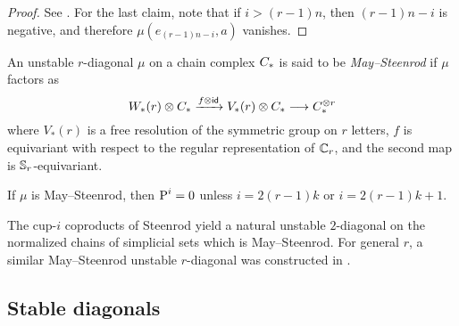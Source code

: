 \begin{proof}
	See \cite{may1970general}.
	For the last claim, note that if $i>(r-1)n$, then $(r-1)n-i$ is negative, and therefore $\mu(e_{(r-1)n-i},a)$ vanishes.
\end{proof}

\begin{definition}
	An unstable $r$-diagonal $\mu$ on a chain complex $C_{*}$ is said to be \emph{May--Steenrod} if $\mu$ factors as
	\[
	W_{*}(r) \otimes C_{*} \xrightarrow{f \otimes \mathsf{id}} V_*(r) \otimes C_{*} \longrightarrow C_{*}^{\otimes r}
	\]
	where $V_*(r)$ is a free resolution of the symmetric group on $r$ letters, $f$ is equivariant with respect to the regular representation of $\mathbb{C}_r$, and the second map is $\mathbb{S}_r$-equivariant.
\end{definition}

\begin{remark}
	If $\mu$ is May--Steenrod, then $\operatorname{P}^i = 0$ unless $i = 2(r-1)k$ or $i = 2(r-1)k+1$.
\end{remark}

\begin{example}
	The cup-$i$ coproducts of Steenrod \cite{steenrod1947products, medina2022axiomatic} yield a natural unstable $2$-diagonal on the normalized chains of simplicial sets which is May--Steenrod.
	For general $r$, a similar May--Steenrod unstable $r$-diagonal was constructed in \cite{medina2021may_st}.
\end{example}

\subsection{Stable diagonals}\label{s:stable}

